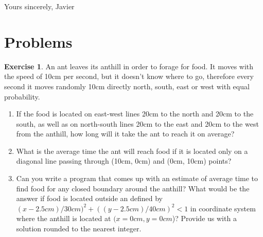 \documentclass{article}
\theoremstyle{plain}
\theoremstyle{definition}
\newtheorem{exercise}{Exercise}
\begin{document}
Yours sincerely,
Javier

\section{Problems}

\begin{exercise}
An ant leaves its anthill in order to forage for food. It moves with the speed of 10cm per second, but it doesn't know where to go, therefore every second it moves randomly 10cm directly north, south, east or west with equal probability.
\begin{enumerate}
  \item If the food is located on east-west lines 20cm to the north and 20cm to the south, as well as on north-south lines 20cm to the east and 20cm to the west from the anthill, how long will it take the ant to reach it on average?
  \item What is the average time the ant will reach food if it is located only on a diagonal line passing through (10cm, 0cm) and (0cm, 10cm) points?
  \item Can you write a program that comes up with an estimate of average time to find food for any closed boundary around the anthill? What would be the answer if food is located outside an defined by $ (x - 2.5cm) / 30cm )^2 + ( (y - 2.5cm) / 40cm )^2 < 1$ in coordinate system where the anthill is located at $(x = 0cm, y = 0cm$)? Provide us with a solution rounded to the nearest integer.
\end{enumerate}
\end{exercise}
\end{document}
